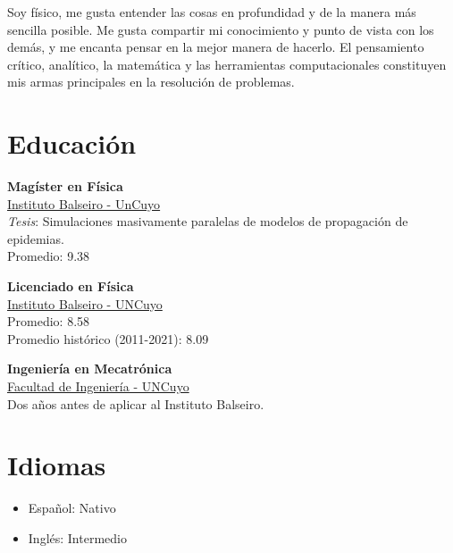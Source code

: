 \documentclass[a4paper,10pt]{article}
\begin{document}
\begin{adjustbox}{valign=t}
\begin{minipage}{.44\textwidth}
Soy físico, me gusta entender las cosas en profundidad y de la manera
más sencilla posible. Me gusta compartir mi conocimiento y punto de vista 
con los demás, y me encanta pensar en la mejor manera de hacerlo. El 
pensamiento crítico, analítico, la matemática y las herramientas 
computacionales constituyen mis armas principales en la resolución de 
problemas.
\vspace*{-.5cm}
\section*{Educación}
	\begin{description}
	\raggedright
	
    \item [\normalfont \textcolor{ColorOne}{Ago. 2021 - Dic. 2022.}] \textbf{Magíster en Física}\\
	\href{https://www.ib.edu.ar/}{\textcolor{ColorTwo}{Instituto Balseiro - UnCuyo}}\\
    \textit{Tesis}: Simulaciones masivamente paralelas de modelos de propagación de epidemias. \\
	Promedio: 9.38
	

	\item [\normalfont \textcolor{ColorOne}{Ago. 2019 - Dic. 2021.}] \textbf{Licenciado en Física}\\
	\href{https://www.ib.edu.ar/}{\textcolor{ColorTwo}{Instituto Balseiro - UNCuyo}}\\
	Promedio: 8.58\\
	Promedio histórico (2011-2021): 8.09
    

	\item [\normalfont \textcolor{ColorOne}{Mar. 2017 - Dic. 2018.}] \textbf{Ingeniería en Mecatrónica}\\ 
	\href{https://ingenieria.uncuyo.edu.ar/}{\textcolor{ColorTwo}{Facultad de Ingeniería - UNCuyo}}\\
    Dos años antes de aplicar al Instituto Balseiro.

	\end{description}
\vspace*{-.8cm}
\section*{Idiomas}
\begin{itemize}
	\raggedright
	\item Español: Nativo
	\item Inglés: Intermedio
\end{itemize}

\vfill
\end{minipage}
\end{adjustbox}
\end{document}

